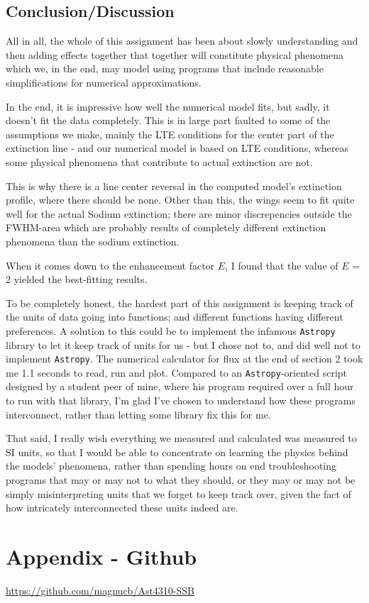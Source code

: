 \documentclass[11pt,a4paper,notitlepage]{article}
\begin{document}
\subsection{Conclusion/Discussion}
All in all, the whole of this assignment has been about slowly understanding and then adding effects together that together will constitute physical phenomena which we, in the end, may model using programs that include reasonable simplifications for numerical approximations.

In the end, it is impressive how well the numerical model fits, but sadly, it doesn't fit the data completely. This is in large part faulted to some of the assumptions we make, mainly the LTE conditions for the center part of the extinction line - and our numerical model is based on LTE conditions, whereas some physical phenomena that contribute to actual extinction are not.

This is why there is a line center reversal in the computed model's extinction profile, where there should be none. Other than this, the wings seem to fit quite well for the actual Sodium extinction; there are minor discrepencies outside the FWHM-area which are probably results of completely different extinction phenomena than the sodium extinction.

When it comes down to the enhancement factor $E$, I found that the value of $E$ = 2 yielded the best-fitting results.

To be completely honest, the hardest part of this assignment is keeping track of the units of data going into functions; and different functions having different preferences. A solution to this could be to implement the infamous \verb|Astropy| library to let it keep track of units for us - but I chose not to, and did well not to implement \verb|Astropy|. The numerical calculator for flux at the end of section 2 took me 1.1 seconds to read, run and plot. Compared to an \verb|Astropy|-oriented script designed by a student peer of mine, where his program required over a full hour to run with that library, I'm glad I've chosen to understand how these programs interconnect, rather than letting some library fix this for me.

That said, I really wish everything we measured and calculated was measured to SI units, so that I would be able to concentrate on learning the physics behind the models' phenomena, rather than spending hours on end troubleshooting programs that may or may not to what they should, or they may or may not be simply misinterpreting units that we forget to keep track over, given the fact of how intricately interconnected these units indeed are.

\section*{Appendix - Github} \label{section:github}
\url{https://github.com/magnucb/Ast4310-SSB}
\end{document}
